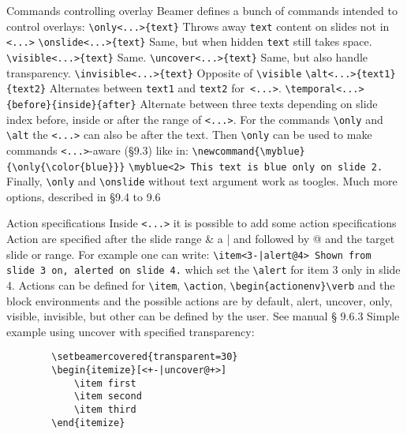 \documentclass[aspectratio=169]{beamer}
\begin{document}
	\begin{frame}[fragile]{Commands controlling overlay}
		Beamer defines a bunch of commands intended to control overlays:
		\verb$\only<...>{text}$ Throws away \verb$text$ content on slides not in \verb$<...>$
		\verb$\onslide<...>{text}$ Same, but when hidden \verb$text$ still takes space.
		\verb$\visible<...>{text}$ Same.
		\verb$\uncover<...>{text}$ Same, but also handle transparency.
		\verb$\invisible<...>{text}$ Opposite of \verb$\visible$
		\verb$\alt<...>{text1}{text2}$ Alternates between \verb$text1$ and \verb$text2$ for\verb$ <...>$.
		\verb$\temporal<...>{before}{inside}{after}$ Alternate between three texts	depending on slide index before, inside or after the range of \verb$<...>$.
		For the commands \verb$\only$ and \verb$\alt$ the \verb$<...>$ can also be after the text.
		Then \verb$\only$ can be used to make commands \verb$<...>$-aware (§9.3) like in:
		\verb$\newcommand{\myblue}{\only{\color{blue}}}$
		\verb$\myblue<2> This text is blue only on slide 2.$
		Finally, \verb$\only$ and \verb$\onslide$ without text argument work as toogles.
		Much more options, described in §9.4 to 9.6
	\end{frame}

	\begin{frame}[fragile]{Action specifications}
		Inside \verb$<...>$ it is possible to add some action specifications
		Action are specified after the slide range \& a | and followed by @ and the target slide or range. 
		For example one can write:
		\verb$\item<3-|alert@4> Shown from slide 3 on, alerted on slide 4.$ 
		which set the \verb$\alert$ for item 3 only in slide 4.
		Actions can be defined for \verb$\item$, \verb$\action$, \verb$\begin{actionenv}\verb$
		and the block environments and the possible actions are by default,
		alert, uncover, only, visible, invisible, but other can be
		defined by the user. See manual § 9.6.3
		Simple example using uncover with specified transparency:
		\begin{verbatim}
		\setbeamercovered{transparent=30}
		\begin{itemize}[<+-|uncover@+>]
			\item first
			\item second
			\item third
		\end{itemize}
		\end{verbatim}
	\end{frame}
\end{document}
